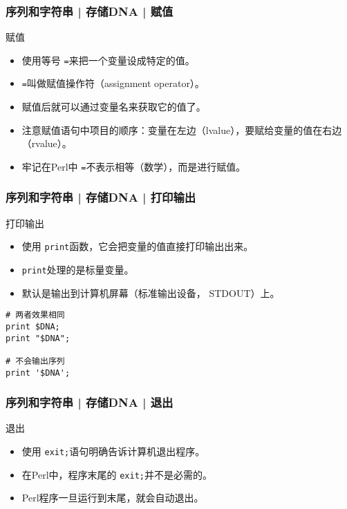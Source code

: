 \begin{frame}[fragile]
  \frametitle{序列和字符串 | 存储DNA | \alert{赋值}}
  \begin{block}{赋值}
    \begin{itemize}
      \item 使用等号 \verb|=|来把一个变量设成特定的值。
      \item \verb|=|叫做赋值操作符（assignment operator）。
      \item 赋值后就可以通过变量名来获取它的值了。
      \item 注意赋值语句中项目的顺序：变量在左边（lvalue），要赋给变量的值在右边（rvalue）。
      \item 牢记在Perl中 \verb|=|不表示相等（数学），而是进行赋值。
    \end{itemize}
  \end{block}
\end{frame}

\begin{frame}[fragile]
  \frametitle{序列和字符串 | 存储DNA | 打印输出}
  \begin{block}{打印输出}
    \begin{itemize}
      \item 使用 \verb|print|函数，它会把变量的值直接打印输出出来。
      \item \verb|print|处理的是标量变量。
      \item 默认是输出到计算机屏幕（标准输出设备， STDOUT）上。
    \end{itemize}
  \end{block}
  \pause
\begin{lstlisting}
# 两者效果相同
print $DNA;
print "$DNA";

# 不会输出序列
print '$DNA';
\end{lstlisting}
\end{frame}

\begin{frame}[fragile]
  \frametitle{序列和字符串 | 存储DNA | \alert{退出}}
  \begin{block}{退出}
    \begin{itemize}
      \item 使用 \verb|exit;|语句明确告诉计算机退出程序。
      \item 在Perl中，程序末尾的 \verb|exit;|并不是必需的。
      \item Perl程序一旦运行到末尾，就会自动退出。
    \end{itemize}
  \end{block}
\end{frame}

